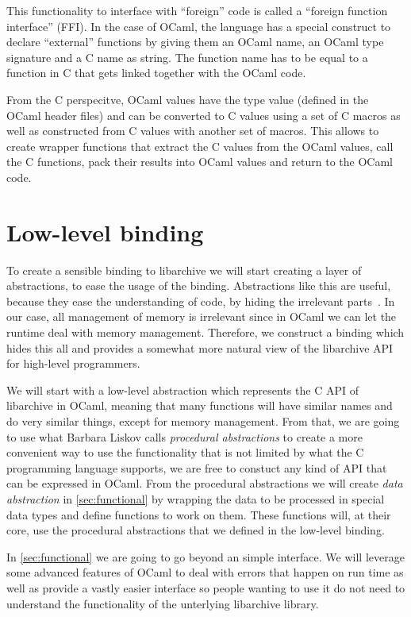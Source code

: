 \documentclass[parskip=half]{scrreprt}
\newcommand\inline[1]{{\addfontfeature{Letters=SmallCaps}#1}}
\begin{document}
This functionality to interface with \enquote{foreign} code is called a
\enquote{foreign function interface} (FFI). In the case of OCaml, the language
has a special construct to declare \enquote{external} functions by giving them
an OCaml name, an OCaml type signature and a C name as string. The function
name has to be equal to a function in C that gets linked together with the
OCaml code.

From the C perspecitve, OCaml values have the type \inline{value} (defined in
the OCaml header files) and can be converted to C values using a set of C
macros as well as constructed from C values with another set of macros. This
allows to create wrapper functions that extract the C values from the OCaml
values, call the C functions, pack their results into OCaml values and return
to the OCaml code.

\section{Low-level binding}
\label{sec:lowlevel}

To create a sensible binding to libarchive we will start creating a layer of
abstractions, to ease the usage of the binding. Abstractions like this are
useful, because they ease the understanding of code, by hiding the irrelevant
parts~\cite[p.~7]{liskov1986abstraction}. In our case, all management of memory
is irrelevant since in OCaml we can let the runtime deal with memory
management.  Therefore, we construct a binding which hides this all and
provides a somewhat more natural view of the libarchive API for high-level
programmers.

We will start with a low-level abstraction which represents the C API of
libarchive in OCaml, meaning that many functions will have similar names and do
very similar things, except for memory management. From that, we are going to
use what Barbara Liskov calls \emph{procedural abstractions} to create a more
convenient way to use the functionality that is not limited by what the C
programming language supports, we are free to constuct any kind of API that can
be expressed in OCaml. From the procedural abstractions we will create
\emph{data abstraction} in \autoref{sec:functional} by wrapping the data to be
processed in special data types and define functions to work on them. These
functions will, at their core, use the procedural abstractions that we defined
in the low-level binding.

In \autoref{sec:functional} we are going to go beyond an simple interface. We
will leverage some advanced features of OCaml to deal with errors that happen
on run time as well as provide a vastly easier interface so people wanting to
use it do not need to understand the functionality of the unterlying libarchive
library.
\end{document}
